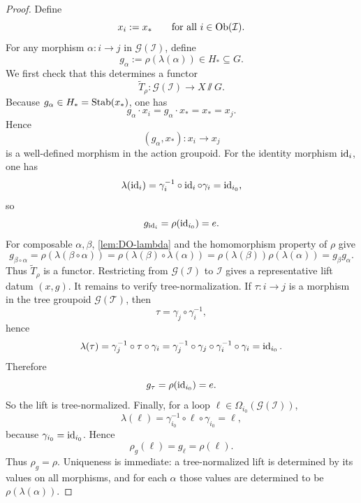 \begin{proof}
	Define
	\[
		x_i:=x_*
		\qquad
		\text{for all }i\in\operatorname{Ob}(\mathcal I).
	\]
	For any morphism \(\alpha:i\to j\) in \(\mathcal G(\mathcal I)\), define
	\[
		g_\alpha:=\rho(\lambda(\alpha))\in H_*\subseteq G.
	\]
	We first check that this determines a functor
	\[
		\widetilde T_\rho:\mathcal G(\mathcal I)\to X\sslash G.
	\]
	Because \(g_\alpha\in H_*=\operatorname{Stab}(x_*)\), one has
	\[
		g_\alpha\cdot x_i=g_\alpha\cdot x_*=x_*=x_j.
	\]
	Hence
	\[
		(g_\alpha,x_*):x_i\to x_j
	\]
	is a well-defined morphism in the action groupoid.
	For the identity morphism \(\operatorname{id}_i\), one has
	\[
		\lambda(\operatorname{id}_i)=\gamma_i^{-1}\circ \operatorname{id}_i\circ \gamma_i=\operatorname{id}_{i_0},
	\]
	so
	\[
		g_{\operatorname{id}_i}=\rho(\operatorname{id}_{i_0})=e.
	\]
	For composable \(\alpha,\beta\), \cref{lem:DO-lambda} and the
	homomorphism property of \(\rho\) give
	\[
		g_{\beta\circ \alpha}
		=
		\rho(\lambda(\beta\circ \alpha))
		=
		\rho(\lambda(\beta)\circ \lambda(\alpha))
		=
		\rho(\lambda(\beta))\rho(\lambda(\alpha))
		=
		g_\beta g_\alpha.
	\]
	Thus \(\widetilde T_\rho\) is a functor.
	Restricting from \(\mathcal G(\mathcal I)\) to \(\mathcal I\) gives a
	representative lift datum \((x,g)\).
	It remains to verify tree-normalization. If \(\tau:i\to j\) is a
	morphism in the tree groupoid \(\mathcal G(\mathcal T)\), then
	\[
		\tau=\gamma_j\circ \gamma_i^{-1},
	\]
	hence
	\[
		\lambda(\tau)
		=
		\gamma_j^{-1}\circ \tau\circ \gamma_i
		=
		\gamma_j^{-1}\circ \gamma_j\circ \gamma_i^{-1}\circ \gamma_i
		=
		\operatorname{id}_{i_0}.
	\]
	Therefore
	\[
		g_\tau=\rho(\operatorname{id}_{i_0})=e.
	\]
	So the lift is tree-normalized.
	Finally, for a loop \(\ell\in \Omega_{i_0}(\mathcal G(\mathcal I))\),
	\[
		\lambda(\ell)
		=
		\gamma_{i_0}^{-1}\circ \ell\circ \gamma_{i_0}
		=
		\ell,
	\]
	because \(\gamma_{i_0}=\operatorname{id}_{i_0}\). Hence
	\[
		\rho_g(\ell)=g_\ell=\rho(\ell).
	\]
	Thus \(\rho_g=\rho\).
	Uniqueness is immediate: a tree-normalized lift is determined by its
	values on all morphisms, and for each \(\alpha\) those values are determined
	to be \(\rho(\lambda(\alpha))\).
\end{proof}
